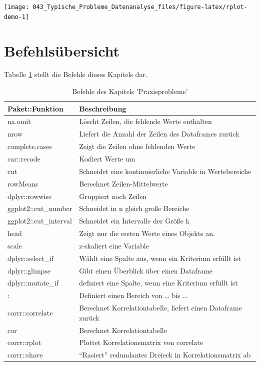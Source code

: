 \documentclass[12pt,ngerman,]{book}
\theoremstyle{definition}
\theoremstyle{definition}
\theoremstyle{remark}
\begin{document}
\begin{center}\texttt{[image: 043\_Typische\_Probleme\_Datenanalyse\_files/figure-latex/rplot-demo-1]} \end{center}

\section{Befehlsübersicht}\label{befehlsubersicht-3}

Tabelle \ref{tab:befehle-praxisprobleme} stellt die Befehle dieses
Kapitels dar.

\begin{table}

\caption{\label{tab:befehle-praxisprobleme}Befehle des Kapitels 'Praxisprobleme'}
\centering
\begin{tabular}[t]{l|l}
\hline
Paket::Funktion & Beschreibung\\
\hline
na.omit & Löscht Zeilen, die fehlende Werte enthalten\\
\hline
nrow & Liefert die Anzahl der Zeilen des Dataframes zurück\\
\hline
complete.cases & Zeigt die Zeilen ohne fehlenden Werte\\
\hline
car::recode & Kodiert Werte um\\
\hline
cut & Schneidet eine kontinuierliche Variable in Wertebereiche\\
\hline
rowMeans & Berechnet Zeilen-Mittelwerte\\
\hline
dplyr::rowwise & Gruppiert nach Zeilen\\
\hline
ggplot2::cut\_number & Schneidet in n gleich große Bereiche\\
\hline
ggplot2::cut\_interval & Schneidet ein Intervalle der Größe k\\
\hline
head & Zeigt nur die ersten Werte eines Objekts an.\\
\hline
scale & z-skaliert eine Variable\\
\hline
dplyr::select\_if & Wählt eine Spalte aus, wenn ein Kriterium erfüllt ist\\
\hline
dplyr::glimpse & Gibt einen Überblick über einen Dataframe\\
\hline
dplyr::mutate\_if & definiert eine Spalte, wenn eine Kriterium erfüllt ist\\
\hline
: & Definiert einen Bereich von … bis …\\
\hline
corrr::correlate & Berechnet Korrelationtabelle, liefert einen Dataframe zurück\\
\hline
cor & Berechnet Korrelationtabelle\\
\hline
corrr::rplot & Plottet Korrelationsmatrix von correlate\\
\hline
corrr::shave & “Rasiert” redundantes Dreieck in Korrelationsmatrix ab\\
\hline
\end{tabular}
\end{table}
\end{document}
